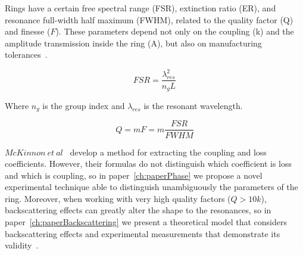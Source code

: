Rings have a certain free spectral range (FSR), extinction ratio (ER), and resonance full-width half maximum (FWHM), related to the quality factor (Q) and finesse ($F$). These parameters depend not only on the coupling (k) and the amplitude transmission inside the ring (A), but also on manufacturing tolerances~\cite{Bogaerts:12}.

\begin{equation}
	FSR=\frac{\lambda_{res}^2}{n_gL}
\end{equation} 

Where $n_g$ is the group index and $\lambda_{res}$ is the resonant wavelength.

\begin{equation}
	Q=mF=m\frac{FSR}{FWHM}
\end{equation} 



$McKinnon~et~al$~\cite{McKinnon2009} develop a method for extracting the coupling and loss coefficients.
However, their formulas do not distinguish which coefficient is loss and which is coupling, so in paper~\ref{ch:paperPhase} we propose a novel experimental technique able to distinguish unambiguously the parameters of the ring. %
Moreover, when working with very high quality factors ($Q>10k$), backscattering effects can greatly alter the shape to the resonances, so in paper~\ref{ch:paperBackscattering} we present a theoretical model that considers backscattering effects and experimental measurements that demonstrate its validity~\cite{Ballesteros2011}.


